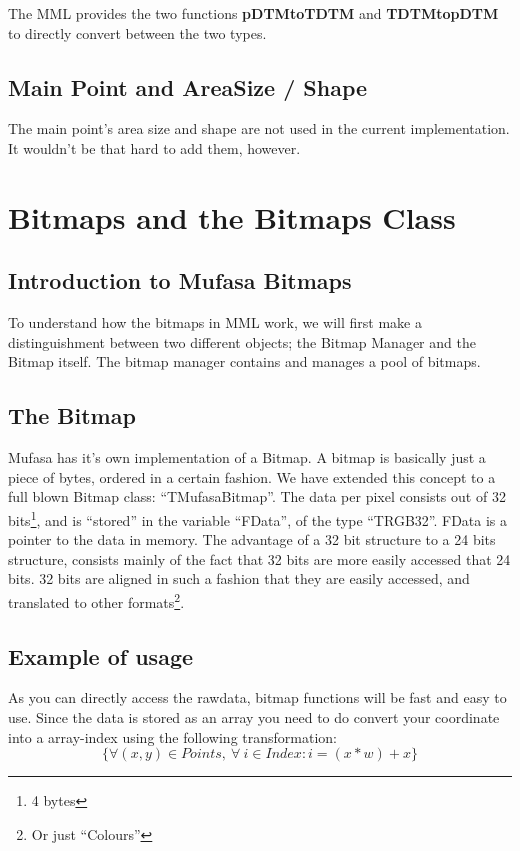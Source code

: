 \documentclass[a4paper, 10pt]{report} %
\begin{document}
The MML provides the two functions \textbf{pDTMtoTDTM} and \textbf{TDTMtopDTM} to
directly convert between the two types.

\subsection{Main Point and AreaSize / Shape}

The main point's area size and shape are not used in the current
implementation. It wouldn't be that hard to add them, however.



\section{Bitmaps and the Bitmaps Class}

\subsection{Introduction to Mufasa Bitmaps}
To understand how the bitmaps in MML work, we will first make a 
distinguishment between two different objects; the Bitmap Manager and the 
Bitmap itself. The bitmap manager contains and manages a pool of bitmaps.


\subsection{The Bitmap}

Mufasa has it's own implementation of a Bitmap.
A bitmap is basically just a piece of bytes, ordered in a certain fashion.
We have extended this concept to a full blown Bitmap class: ``TMufasaBitmap''.
The data per pixel consists out of 32 bits\footnote{4 bytes}, and is 
``stored'' in the variable ``FData'', of the type ``TRGB32''.
FData is a pointer to the data in memory.
The advantage of a 32 bit structure to a 24 bits structure, consists mainly
of the fact that 32 bits are more easily accessed that 24 bits. 32 bits are
aligned in such a fashion that they are easily accessed, and translated to
other formats\footnote{Or just ``Colours''}.

\subsection{Example of usage}
As you can directly access the rawdata, bitmap functions will be fast and 
easy to use. Since the data is stored as an array you need to do convert your
coordinate into a array-index using the following transformation:
$$ \{\forall (x, y) \in Points,\ \forall\ i \in Index: i = (x * w) + x \} $$
\end{document}
